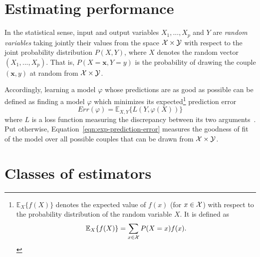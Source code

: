 \section{Estimating performance}

In the statistical sense, input and output variables $X_1, ..., X_p$ and $Y$
are \textit{random variables} taking jointly their values from the space ${\cal X}
\times {\cal Y}$ with respect to the joint probability distribution $P(X, Y)$,
where $X$ denotes the random vector $(X_1, ..., X_p)$. That is,
$P(X=\mathbf{x}, Y=y)$ is the probability of drawing the couple $(\mathbf{x},
y)$ at random from ${\cal X} \times {\cal Y}$.

Accordingly, learning a model $\varphi$ whose predictions are as good as
possible can be defined as finding a model $\varphi$ which minimizes its
expected\footnote{$\mathbb{E}_X \{f(X)\}$ denotes the expected value of $f(x)$
(for $x \in {\cal X}$) with respect to the probability distribution of the
random variable $X$. It is defined as $$\mathbb{E}_X \{f(X)\} = \sum_{x \in {\cal
X}} P(X=x) f(x).$$} prediction error
\begin{equation}\label{eqn:exp-prediction-error}
Err(\varphi) = \mathbb{E}_{X, Y}\{ L(Y, \varphi(X)) \}
\end{equation}
where $L$ is a loss function measuring the discrepancy between its two
arguments~\citep{geurts:2002}. Put otherwise, Equation~\ref{eqn:exp-prediction-error}
measures the goodness of fit of the model over all possible couples that
can be drawn from ${\cal X}\times {\cal Y}$.




\section{Classes of estimators}
